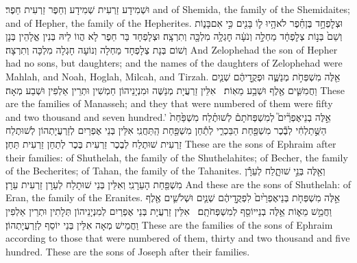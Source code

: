 {וּשְׁמִידָע זַרְעִית שְׁמִידָע וְחֵפֶר זַרְעִית חֵפֶר׃}
{and of Shemida, the family of the Shemidaites; and of Hepher, the family of the Hepherites.}{}
{וּצְלׇפְחָ֣ד בֶּן\maqqaf חֵ֗פֶר לֹא\maqqaf הָ֥יוּ ל֛וֹ בָּנִ֖ים כִּ֣י אִם\maqqaf בָּנ֑וֹת וְשֵׁם֙ בְּנ֣וֹת צְלׇפְחָ֔ד מַחְלָ֣ה וְנֹעָ֔ה חׇגְלָ֥ה מִלְכָּ֖ה וְתִרְצָֽה׃}
{וּצְלָפְחָד בַּר חֵפֶר לָא הֲווֹ לֵיהּ בְּנִין אֱלָהֵין בְּנָן וְשׁוֹם בְּנָת צְלָפְחָד מַחְלָה וְנוֹעָה חָגְלָה מִלְכָּה וְתִרְצָה׃}
{And Zelophehad the son of Hepher had no sons, but daughters; and the names of the daughters of Zelophehad were Mahlah, and Noah, Hoglah, Milcah, and Tirzah.}{}
{אֵ֖לֶּה מִשְׁפְּחֹ֣ת מְנַשֶּׁ֑ה וּפְקֻ֣דֵיהֶ֔ם שְׁנַ֧יִם וַחֲמִשִּׁ֛ים אֶ֖לֶף וּשְׁבַ֥ע מֵאֽוֹת׃ \setuma }
{אִלֵּין זַרְעֲיָת מְנַשֶּׁה וּמִנְיָנֵיהוֹן חַמְשִׁין וּתְרֵין אַלְפִין וּשְׁבַע מְאָה׃}
{These are the families of Manasseh; and they that were numbered of them were fifty and two thousand and seven hundred.’}{}
{אֵ֣לֶּה בְנֵי\maqqaf אֶפְרַ֘יִם֮ לְמִשְׁפְּחֹתָם֒ לְשׁוּתֶ֗לַח מִשְׁפַּ֙חַת֙ הַשֻּׁ֣תַלְחִ֔י לְבֶ֕כֶר מִשְׁפַּ֖חַת הַבַּכְרִ֑י לְתַ֕חַן מִשְׁפַּ֖חַת הַֽתַּחֲנִֽי׃}
{אִלֵּין בְּנֵי אֶפְרַיִם לְזַרְעֲיָתְהוֹן לְשׁוּתֶלַח זַרְעִית שׁוּתֶלַח לְבֶכֶר זַרְעִית בֶּכֶר לְתַחַן זַרְעִית תַּחַן׃}
{These are the sons of Ephraim after their families: of Shuthelah, the family of the Shuthelahites; of Becher, the family of the Becherites; of Tahan, the family of the Tahanites.}{}
{וְאֵ֖לֶּה בְּנֵ֣י שׁוּתָ֑לַח לְעֵרָ֕ן מִשְׁפַּ֖חַת הָעֵרָנִֽי׃}
{וְאִלֵּין בְּנֵי שׁוּתָלַח לְעֵרָן זַרְעִית עֵרָן׃}
{And these are the sons of Shuthelah: of Eran, the family of the Eranites.}{}
{אֵ֣לֶּה מִשְׁפְּחֹ֤ת בְּנֵי\maqqaf אֶפְרַ֙יִם֙ לִפְקֻ֣דֵיהֶ֔ם שְׁנַ֧יִם וּשְׁלֹשִׁ֛ים אֶ֖לֶף וַחֲמֵ֣שׁ מֵא֑וֹת אֵ֥לֶּה בְנֵי\maqqaf יוֹסֵ֖ף לְמִשְׁפְּחֹתָֽם׃ \setuma }
{אִלֵּין זַרְעֲיָת בְּנֵי אֶפְרַיִם לְמִנְיָנֵיהוֹן תְּלָתִין וּתְרֵין אַלְפִין וַחֲמֵישׁ מְאָה אִלֵּין בְּנֵי יוֹסֵף לְזַרְעֲיָתְהוֹן׃}
{These are the families of the sons of Ephraim according to those that were numbered of them, thirty and two thousand and five hundred. These are the sons of Joseph after their families.}{}
